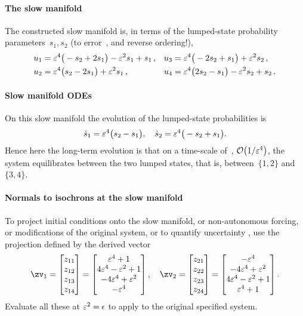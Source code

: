 \paragraph{The slow manifold} 
The constructed slow manifold is, in terms of the lumped-state probability parameters~\(s_1,s_2\) (to error~, and reverse ordering!), 
\begin{align*}&
u_{1}=\varepsilon^{4} \big(-s_{2}+2 s_{1}\big)-\varepsilon^{2} s_{1}+s_{1}\,, &&
u_{3}=\varepsilon^{4} \big(-2 s_{2}+s_{1}\big)+\varepsilon^{2} s_{2}\,, \\&
u_{2}=\varepsilon^{4} \big(s_{2}-2 s_{1}\big)+\varepsilon^{2} s_{1}\,, &&
u_{4}=\varepsilon^{4} \big(2 s_{2}-s_{1}\big)-\varepsilon^{2} s_{2}+s_{2}\,.
\end{align*}

\paragraph{Slow manifold ODEs} 
On this slow manifold the evolution of the lumped-state probabilities is
\begin{equation*}
\dot s_{1}=\varepsilon^{4} \big(s_{2}-s_{1}\big),\quad
\dot s_{2}=\varepsilon^{4} \big(-s_{2}+s_{1}\big).
\end{equation*}
Hence here the long-term evolution is that on a time-scale of~, \(\Ord{1/\eps^4}\), the system equilibrates between the two lumped states, that is, between~\(\{1,2\}\) and~\(\{3,4\}\).


\paragraph{Normals to isochrons at the slow manifold}
To project initial conditions
onto the slow manifold, or non-autonomous
forcing, or modifications of the original system, or to quantify uncertainty \cite[]{Roberts89b, Roberts97b}, use the projection defined by the derived vector
\begin{equation*}
\zv_1=\begin{bmatrix}z_{11}\\z_{12}\\z_{13}\\z_{14}\end{bmatrix}
=\begin{bmatrix}
\eps^{4}+1\\
4 \eps^{4}-\eps^{2}+1\\
-4 \eps^{4}+\eps^{2}\\
-\eps^{4}
\end{bmatrix},\quad
\zv_2=\begin{bmatrix}z_{21}\\z_{22}\\z_{23}\\z_{24}\end{bmatrix}
=\begin{bmatrix}
-\eps^{4}\\
-4 \eps^{4}+\eps^{2}\\
4 \eps^{4}-\eps^{2}+1\\
\eps^{4}+1
\end{bmatrix}
.
\end{equation*}
Evaluate all these at \(\varepsilon^2=\epsilon\) to apply to the original specified system.


